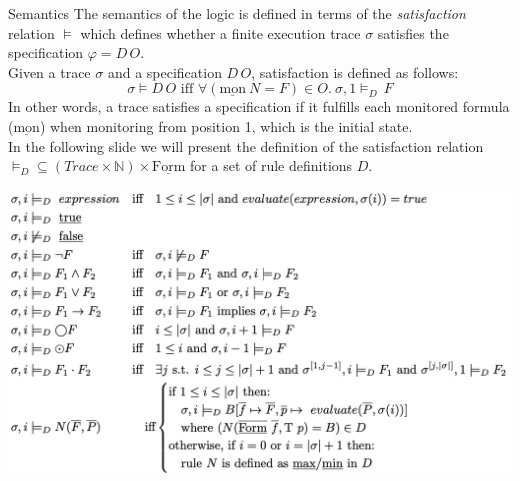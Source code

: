 \documentclass[aspectratio=169,t,xcolor=table]{beamer}
\begin{document}
\begin{frame}[allowframebreaks]{Semantics}
    The semantics of the logic is defined in terms of the \textit{satisfaction} relation $\models$ which defines whether a finite execution trace $\sigma$ satisfies the specification $\varphi=D \, O$.\\
    \vspace*{5mm}
    Given a trace $\sigma$ and a specification $D \, O$, satisfaction is defined as follows:
    \[
    \sigma \models D \, O \text{ iff } \forall (\underline{\text{mon}}\ N = F) \in O.\ \sigma ,1 \models_D \, F
    \]
    In other words, a trace satisfies a specification if it fulfills each monitored formula ($\underline{\text{mon}}$) when monitoring from position 1, which is the initial state.\\
    \vspace*{5mm}
    In the following slide we will present the definition of the satisfaction relation $\models_D \subseteq (Trace \times \mathbb{N}) \times \underline{\text{Form}}$ for a set of rule definitions $D$. 
    
    \includegraphics[scale=0.27]{images/semantics.png}
\end{frame}
\end{document}
